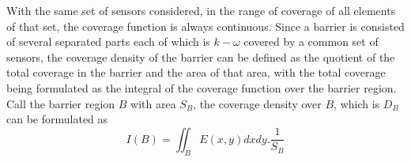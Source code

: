 With the same set of sensors considered, in the range of coverage of all elements of that set, the coverage function is always continuous. Since a barrier is consisted of several separated parts each of which is $k-\omega$ covered by a common set of sensors, the coverage density of the barrier can be defined as the quotient of the total coverage in the barrier and the area of that area, with the total coverage being formulated as the integral of the coverage function over the barrier region. Call the barrier region $B$ with area $S_B$, the coverage density over $B$, which is $D_B$ can be formulated as
\begin{equation}
\label{eq5}
I(B) = \iint_B{E(x, y)dxdy}.\frac{1}{S_B}
\end{equation}

